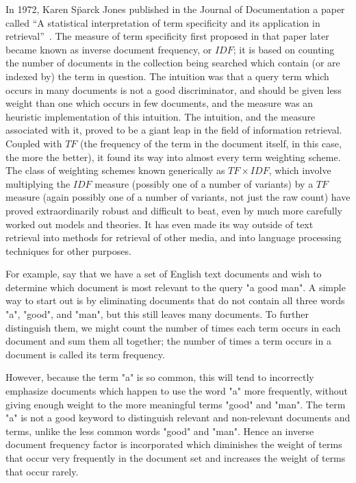 In 1972, Karen Sp̈arck Jones published in the Journal of Documentation a paper called ``A statistical interpretation of term specificity and its application in retrieval''~\cite{Jones72astatistical}. The measure of term specificity first proposed in that paper later became known as inverse document frequency, or $IDF$; it is based on counting the number of documents in the collection being searched which contain (or are indexed by) the term in question. The intuition was that a query term which occurs in many documents is not a good discriminator, and should be given less weight than one which occurs in few documents, and the measure was an heuristic implementation of this intuition.
The intuition, and the measure associated with it, proved to be a giant leap in the field of information retrieval. Coupled with $TF$ (the frequency of the term in the document itself, in this case, the more the better), it found its way into almost every term weighting scheme.
The class of weighting schemes known generically as $TF \times IDF$, which involve multiplying the $IDF$ measure (possibly one of a number of variants) by a $TF$ measure (again possibly one of a number of variants, not just the raw count) have proved extraordinarily robust and difficult to beat, even by much more carefully worked out models and theories. It has even made its way outside of text retrieval into methods for retrieval of other media, and into language processing techniques for other purposes.

For example, say that we have a set of English text documents and wish to determine which document is most relevant to the query "a good man". A simple way to start out is by eliminating documents that do not contain all three words "a", "good", and "man", but this still leaves many documents. To further distinguish them, we might count the number of times each term occurs in each document and sum them all together; the number of times a term occurs in a document is called its term frequency.

However, because the term "a" is so common, this will tend to incorrectly emphasize documents which happen to use the word "a" more frequently, without giving enough weight to the more meaningful terms "good" and "man". The term "a" is not a good keyword to distinguish relevant and non-relevant documents and terms, unlike the less common words "good" and "man". Hence an inverse document frequency factor is incorporated which diminishes the weight of terms that occur very frequently in the document set and increases the weight of terms that occur rarely.


